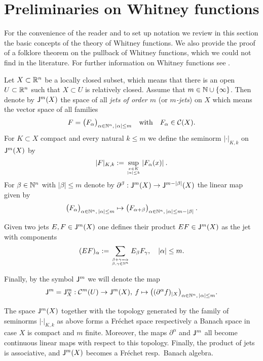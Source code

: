 %
%
\section{Preliminaries on Whitney functions}
\label{sec:whitney-functions}
For the convenience of the reader and to set up notation we review in
this section the basic concepts of the theory of Whitney functions. 
We also provide the proof of a folklore theorem on the pullback of Whitney functions, 
which we could not find in the literature.
For further information on Whitney functions see \cite{MalIDF}.

\begin{definition}
  Let $X\subset \mathbb{R}^n$ be a locally closed subset, which means that there is
  an open $U\subset \mathbb{R}^n$ such that  $X\subset U$ is relatively  closed. 
  Assume that $m \in \mathbb{N}\cup \{ \infty\}$. Then denote by
  $\mathsf{J}^m (X)$ the space of all \textit{jets of order $m$} 
  (or \textit{$m$-jets}) on $X$ which means the vector space of all families
  \[
    F = \big( F_\alpha \big)_{\alpha \in \mathbb{N}^n, \, |\alpha| \leq m}
    \quad \text{with} \quad F_\alpha \in \mathcal{C} (X) . 
  \]
  For $K\subset X$ compact and every natural $k \leq m$ we define the 
  seminorm
  $| \cdot |_{K,k}$ on $\mathsf{J}^m (X)$ by
  \[
    | F|_{K,k} := \sup_{x\in K\atop |\alpha| \leq k} | F_\alpha (x) | \: .
  \]
  For $\beta \in \mathbb{N}^n$ with $| \beta | \leq m$ denote by 
  $\partial^\beta : \mathsf{J}^m (X) \rightarrow \mathsf{J}^{m-|\beta|} (X)$ the 
  linear map given by 
  \[
    \big( F_\alpha \big)_{\alpha \in \mathbb{N}^n, \, |\alpha| \leq m}
    \mapsto \big( F_{\alpha+\beta} \big)_{\alpha \in \mathbb{N}^n, \, 
    |\alpha| \leq m-|\beta|} \: .
  \]

  Given two jets $E,F\in \mathsf{J}^m (X)$ one defines their product 
  $ E F\in \mathsf{J}^m (X)$
  as the jet with components 
  \[
     ( EF )_\alpha := \sum_{\beta + \gamma = \alpha \atop \beta , \gamma \in \mathbb{N}^n}
     E_\beta F_\gamma, \quad |\alpha| \leq m.
  \]
 
  Finally, by the symbol $\mathsf{J}^m $ we will denote the map 
  \[
   \mathsf{J}^m=\mathsf{J}^m_X: \mathcal{C}^m (U) \rightarrow \mathsf{J}^m (X), \:
   f \mapsto \big( (\partial^\alpha f)_{|X} \big)_{\alpha \in \mathbb{N}^n, \, |\alpha| \leq m} . 
  \]
\end{definition}
  The space $\mathsf{J}^m (X)$ together with the topology generated by the family of 
  seminorms $| \cdot |_{K,k}$ as above forms a Fr\'echet space respectively 
  a Banach space in case $X$ is compact and $m$ finite. Moreover, the maps 
  $\partial^\alpha$ and $\mathsf{J}^m$ all become continuous linear maps with respect to 
  this topology. Finally, the product of jets is associative, and $\mathsf{J}^m (X)$
  becomes a Fr\'echet resp.~Banach algebra. 

